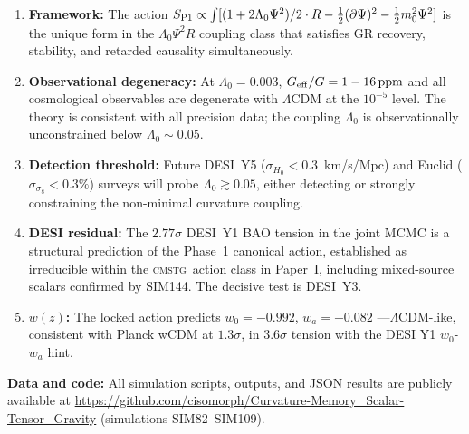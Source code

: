 \documentclass[12pt,a4paper]{article}
\newcommand{\CMSTG}{\textsc{cmstg}}
\newcommand{\Geff}{G_{\rm eff}}
\newcommand{\Lz}{\Lambda_0}
\begin{document}
\begin{enumerate}
  \item \textbf{Framework:} The action $S_{\rm P1} \propto \int [(1+2\Lz\Psi^2)/2 \cdot R
        - \frac{1}{2}(\partial\Psi)^2 - \frac{1}{2}m_0^2\Psi^2]$ is the unique
        form in the $\Lz\Psi^2 R$ coupling class that satisfies GR recovery,
        stability, and retarded causality simultaneously.

  \item \textbf{Observational degeneracy:} At $\Lz = 0.003$, $\Geff/G = 1 - 16\,\mathrm{ppm}$
        and all cosmological observables are degenerate with $\Lambda$CDM at
        the $10^{-5}$ level. The theory is consistent with all precision
        data; the coupling $\Lz$ is observationally unconstrained below
        $\Lz \sim 0.05$.

  \item \textbf{Detection threshold:} Future DESI~Y5 ($\sigma_{H_0} < 0.3$~km/s/Mpc)
        and Euclid ($\sigma_{\sigma_8} < 0.3\%$) surveys will probe
        $\Lz \gtrsim 0.05$, either detecting or strongly constraining the
        non-minimal curvature coupling.

  \item \textbf{DESI residual:} The $2.77\sigma$ DESI~Y1 BAO tension in the
        joint MCMC is a structural prediction of the Phase~1 canonical action,
        established as irreducible within the \CMSTG\ action class in Paper~I,
        including mixed-source scalars confirmed by SIM144.
        The decisive test is DESI~Y3.

  \item \textbf{$w(z)$:} The locked action predicts $w_0 = -0.992$, $w_a = -0.082$
        ---$\Lambda$CDM-like, consistent with Planck wCDM at $1.3\sigma$, in
        $3.6\sigma$ tension with the DESI Y1 $w_0$-$w_a$ hint.
\end{enumerate}

\bigskip
\noindent\textbf{Data and code:}
All simulation scripts, outputs, and JSON results are publicly available at
\url{https://github.com/cisomorph/Curvature-Memory_Scalar-Tensor_Gravity}
(simulations SIM82--SIM109).
\end{document}
